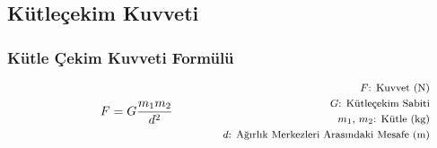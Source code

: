 \subsection{Kütleçekim Kuvveti}

\subsubsection*{Kütle Çekim Kuvveti Formülü}
\begin{equation}
    F = G \frac{m_1 m_2}{d^2} \qquad \qquad \parbox{4cm}{\footnotesize$\begin{aligned}
        F\text{: Kuvvet (N) } \\
        G\text{: Kütleçekim Sabiti }\\
        m_1\text{, }m_2\text{: Kütle (kg) } \\
        d\text{: Ağırlık Merkezleri Arasındaki Mesafe (m) } \\
\end{aligned}$}
\end{equation}
